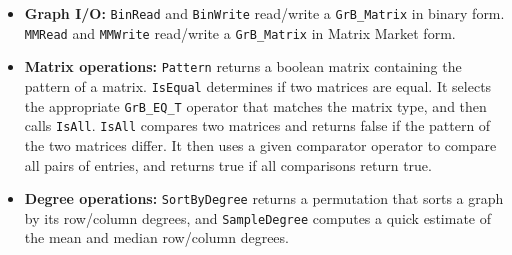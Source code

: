 \begin{itemize}

\item {\bf Graph I/O:}
    \verb'BinRead' and \verb'BinWrite' read/write a \verb'GrB_Matrix' in binary form.
    \verb'MMRead' and \verb'MMWrite' read/write a \verb'GrB_Matrix' in Matrix Market form.

\item {\bf Matrix operations:}
    \verb'Pattern' returns a boolean matrix containing the pattern of a matrix.
    \verb'IsEqual' determines if two matrices are equal.  It selects the appropriate
    \verb'GrB_EQ_T' operator that matches the matrix type, and then calls \verb'IsAll'.
    \verb'IsAll' compares two matrices and returns false if
    the pattern of the two matrices differ.  It then uses a given comparator operator to
    compare all pairs of entries, and returns true if all comparisons return true.

\item {\bf Degree operations:}
    \verb'SortByDegree' returns a permutation that sorts a graph by its row/column degrees, and
    \verb'SampleDegree' computes a quick estimate of the mean and median row/column degrees.


\end{itemize}
